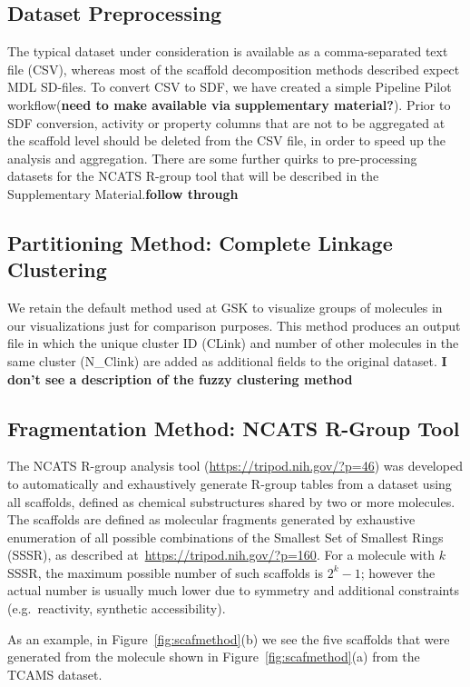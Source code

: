 \documentclass[journal=jacsat,manuscript=article]{achemso}
\newcommand*\fref[1]{Figure~\ref{fig:#1}}
\newcommand*\eg{e.g.~}
\begin{document}
\subsection{Dataset Preprocessing}
\label{sec:prepro}
The typical dataset under consideration is available as a comma-separated text file (CSV), whereas most of the scaffold decomposition methods described expect MDL SD-files. To convert CSV to SDF, we have created a simple Pipeline Pilot workflow(\textbf{need to make available via supplementary material?}).  Prior to SDF conversion, activity or property columns that are not to be aggregated at the scaffold level should be deleted from the CSV file, in order to speed up the analysis and aggregation.  There are some further quirks to pre-processing datasets for the NCATS R-group tool that will be described in the Supplementary Material.\textbf{follow through}  

\subsection{Partitioning Method: Complete Linkage Clustering}
We retain the default method used at GSK to visualize groups of molecules in our visualizations just for comparison purposes. This method produces an output file in which the unique cluster ID (CLink) and number of other molecules in the same cluster (N\_Clink) are added as additional fields to the original dataset.   \textbf{I don't see a description of the fuzzy clustering method}

\subsection{Fragmentation Method: NCATS R-Group Tool}
\label{sec:rgtool}
The NCATS R-group analysis tool (\url{https://tripod.nih.gov/?p=46}) was developed to automatically and exhaustively generate R-group tables from a dataset using all scaffolds, defined as chemical substructures shared by two or more molecules. The scaffolds are defined as molecular fragments generated by exhaustive enumeration of all possible combinations of the Smallest Set of Smallest Rings (SSSR), as described at~\url{https://tripod.nih.gov/?p=160}. For a molecule with $k$ SSSR, the maximum possible number of such scaffolds is $2^k - 1$; however the actual number is usually much lower due to symmetry and additional constraints (\eg reactivity, synthetic accessibility).      

As an example, in \fref{scafmethod}(b) we see the five scaffolds that were generated from the molecule shown in \fref{scafmethod}(a) from the TCAMS dataset.
\end{document}
